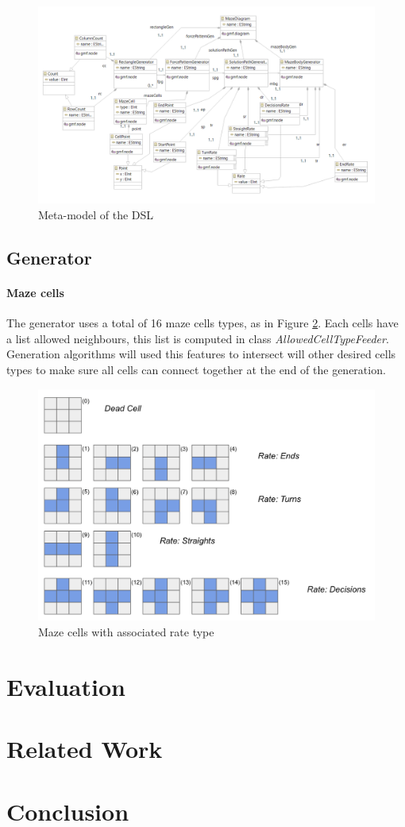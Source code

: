 \documentclass[review]{elsarticle}
\begin{document}
\begin{figure}
	\includegraphics[width=\linewidth]{metamodel.png}
	\caption{Meta-model of the DSL}
	\label{fig:metamodel}
\end{figure}


\subsection{Generator}

\paragraph{Maze cells}
The generator uses a total of 16 maze cells types, as in Figure \ref{fig:cells}. Each cells have a list allowed neighbours, this list is computed in class \textit{AllowedCellTypeFeeder}. Generation algorithms will used this features to intersect will other desired cells types to make sure all cells can connect together at the end of the generation.

\begin{figure}
	\includegraphics[width=\linewidth]{maze_cells_clean.png}
	\caption{Maze cells with associated rate type}
	\label{fig:cells}
\end{figure}

\section{Evaluation}

\section{Related Work}

\section{Conclusion}


\end{document}
